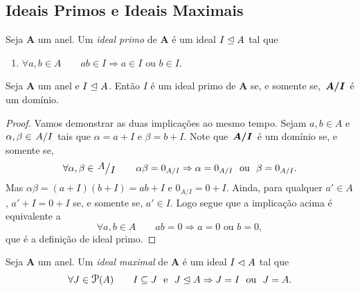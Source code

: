 \subsection{Ideais Primos e Ideais Maximais}

\begin{defi}
	Seja $\bm A$ um anel. Um \emph{ideal primo} de $\bm A$ é um ideal $I \mathrel{\unlhd} A$ tal que
	\begin{enumerate}
	\item $\forall a,b \in A \qquad ab \in I \Rightarrow a \in I \text{\ \ ou\ \ } b \in I$.
	\end{enumerate}
\end{defi}

\begin{teo}
\label{teo:ide.prim.dom}
	Seja $\bm A$ um anel e $I \mathrel{\unlhd} A$. Então $I$ é um ideal primo de $\bm A$ se, e somente se, $\bm{\quo{A}{I}}$ é um domínio.
\end{teo}
\begin{proof}
	Vamos demonstrar as duas implicações ao mesmo tempo. Sejam $a,b \in A$ e $\alpha,\beta \in \quo{A}{I}$ tais que $\alpha=a+I$ e $\beta=b+I$. Note que $\bm{\quo{A}{I}}$ é um domínio se, e somente se,
	\begin{equation*}
	\forall \alpha,\beta \in \quo{A}{I} \qquad \alpha\beta=0_{A/I} \Rightarrow \alpha=0_{A/I} \text{\ \ ou\ \ } \beta=0_{A/I}.
	\end{equation*}
Mas $\alpha\beta=(a+I)(b+I)=ab+I$ e $0_{A/I}=0+I$. Ainda, para qualquer $a' \in A$, $a'+I=0+I$ se, e somente se, $a' \in I$. Logo segue que a implicação acima é equivalente a
	\begin{equation*}
	\forall a,b \in A \qquad ab=0 \Rightarrow a=0 \text{\ \ ou\ \ } b=0,
	\end{equation*}
que é a definição de ideal primo.
\end{proof}

\begin{defi}
	Seja $\bm A$ um anel. Um \emph{ideal maximal} de $\bm A$ é um ideal $I \mathrel{\lhd} A$ tal que
	\begin{equation*}
	\forall J \in \p(A) \qquad I \subseteq J \e J \ide A \Rightarrow J = I \ou J = A.
	\end{equation*}
\end{defi}

